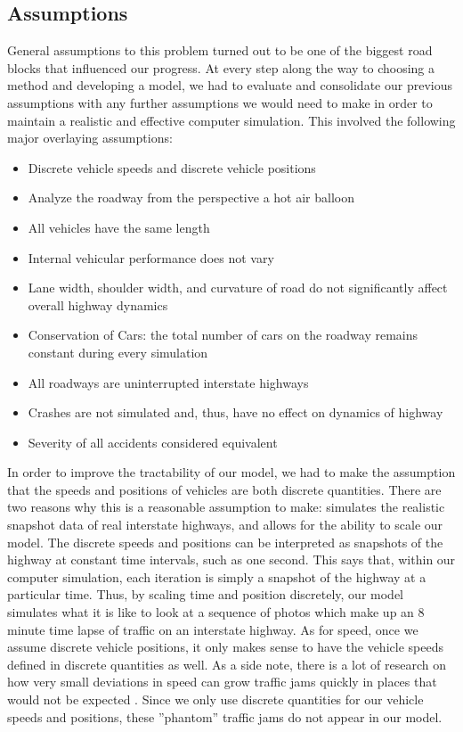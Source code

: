 \documentclass{amsart}
\begin{document}
	\subsection{Assumptions}
		General assumptions to this problem turned out to be one of the biggest road blocks that influenced our progress. At every step along the way to choosing a method and developing a model, we had to evaluate and consolidate our previous assumptions with any further assumptions we would need to make in order to maintain a realistic and effective computer simulation. This involved the following major overlaying assumptions:
		\begin{itemize}
			\item	Discrete vehicle speeds and discrete vehicle positions
			\item	Analyze the roadway from the perspective a hot air balloon
			\item 	All vehicles have the same length
			\item 	Internal vehicular performance does not vary
			\item	Lane width, shoulder width, and curvature of road do not significantly affect overall highway dynamics
			\item 	Conservation of Cars: the total number of cars on the roadway remains constant during every simulation
			
			\item  	All roadways are uninterrupted interstate highways
			\item   Crashes are not simulated and, thus, have no effect on dynamics of highway
			\item 	Severity of all accidents considered equivalent			
		\end{itemize}
		 
		In order to improve the tractability of our model, we had to make the assumption that the speeds and positions of vehicles are both discrete quantities. There are two reasons why this is a reasonable assumption to make: simulates the realistic snapshot data of real interstate highways, and allows for the ability to scale our model. The discrete speeds and positions can be interpreted as snapshots of the highway at constant time intervals, such as one second. This says that, within our computer simulation, each iteration is simply a snapshot of the highway at a particular time. Thus, by scaling time and position discretely, our model simulates what it is like to look at a sequence of photos which make up an 8 minute time lapse of traffic on an interstate highway. As for speed, once we assume discrete vehicle positions, it only makes sense to have the vehicle speeds defined in discrete quantities as well. As a side note, there is a lot of research on how very small deviations in speed can grow traffic jams quickly in places that would not be expected \cite{kurttraffic}. Since we only use discrete quantities for our vehicle speeds and positions, these ''phantom'' traffic jams do not appear in our model.
	
\end{document}
